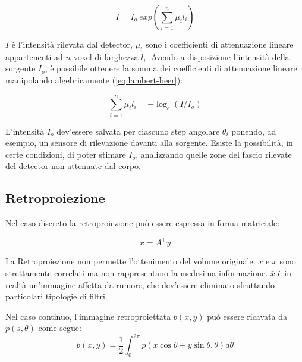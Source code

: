 \documentclass[a4paper,12pt, doubleside]{report}
\begin{document}
                    \begin{equation} \label{eq:lambert-beer}
                        I = I_o \ exp(\sum\limits_{i=1}^n \mu_i l_i)  
                    \end{equation}
                    
                    $I$ è l'intensità rilevata dal detector, $\mu_i$ sono i coefficienti di attenuazione lineare appartenenti ad $n$ voxel di larghezza $l_i$. Avendo a disposizione l'intensità della sorgente $I_o$, è possibile ottenere la somma dei coefficienti di attenuazione lineare manipolando algebricamente (\ref{eq:lambert-beer}):
                        
                    \begin{equation} \label{eq:normalization}
                        \sum\limits_{i=1}^n \mu_i l_i = - \log_e{(I/I_o)}
                    \end{equation}
                    
                    L'intensità $I_o$ dev'essere salvata per ciascuno step angolare $\theta_i$ ponendo, ad esempio, un sensore di rilevazione davanti alla sorgente. Esiste la possibilità, in certe condizioni, di poter stimare $I_o$, analizzando quelle zone del fascio rilevate del detector non attenuate dal corpo.
            
            \subsection{Retroproiezione}
                \par
                    Nel caso discreto la retroproiezione può essere espressa in forma matriciale:
                    
                    \begin{equation}
                        \bar{x} = A^\top y
                    \end{equation}
                    
                    La Retroproiezione non permette l'ottenimento del volume originale: $x$ e $\bar{x}$ sono strettamente correlati ma non rappresentano la medesima informazione. $\bar{x}$ è in realtà un'immagine affetta da rumore, che dev'essere eliminato sfruttando particolari tipologie di filtri.
                
                \bigskip
                \par
                    Nel caso continuo, l'immagine retroproiettata $b(x,y)$ può essere ricavata da $p(s,\theta)$ come segue:
                    \begin{equation}
                        b(x,y) = \frac{1}{2} \int_{0}^{2\pi} p(x \cos \theta + y \sin \theta , \theta ) d\theta
                    \end{equation}
                
\end{document}
